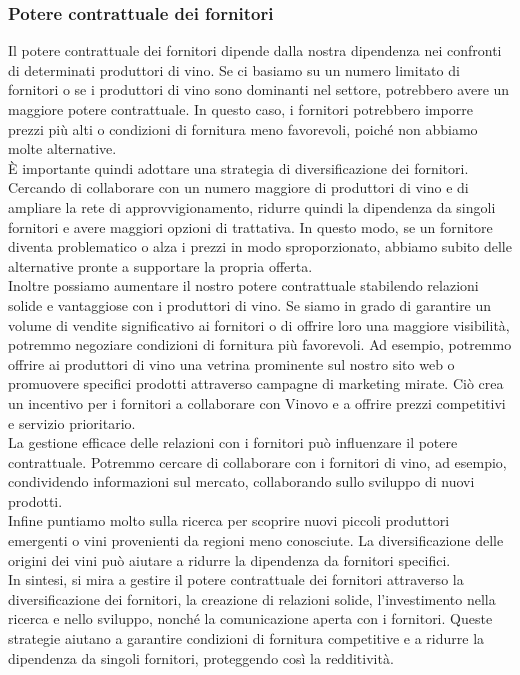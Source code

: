 \documentclass[12pt, a4paper]{article}
\newcommand{\meskip}{\medskip \\}
\newcommand{\bskip}{\bigskip \\}
\begin{document}
\subsubsection{Potere contrattuale dei fornitori}
Il potere contrattuale dei fornitori dipende dalla nostra dipendenza nei confronti di determinati produttori di vino. Se ci basiamo su un numero limitato di fornitori o se i produttori di vino sono dominanti nel settore, potrebbero avere un maggiore potere contrattuale. In questo caso, i fornitori potrebbero imporre prezzi più alti o condizioni di fornitura meno favorevoli, poiché non abbiamo molte alternative.\meskip
È importante quindi adottare una strategia di diversificazione dei fornitori. Cercando di collaborare con un numero maggiore di produttori di vino e di ampliare la rete di approvvigionamento, ridurre quindi la dipendenza da singoli fornitori e avere maggiori opzioni di trattativa. In questo modo, se un fornitore diventa problematico o alza i prezzi in modo sproporzionato, abbiamo subito delle alternative pronte a supportare la propria offerta.\meskip
Inoltre possiamo aumentare il nostro potere contrattuale stabilendo relazioni solide e vantaggiose con i produttori di vino. Se siamo in grado di garantire un volume di vendite significativo ai fornitori o di offrire loro una maggiore visibilità, potremmo negoziare condizioni di fornitura più favorevoli. Ad esempio, potremmo offrire ai produttori di vino una vetrina prominente sul nostro sito web o promuovere specifici prodotti attraverso campagne di marketing mirate. Ciò crea un incentivo per i fornitori a collaborare con Vinovo e a offrire prezzi competitivi e servizio prioritario.\meskip
La gestione efficace delle relazioni con i fornitori può influenzare il potere contrattuale. Potremmo cercare di collaborare con i fornitori di vino, ad esempio, condividendo informazioni sul mercato, collaborando sullo sviluppo di nuovi prodotti.\meskip
Infine puntiamo molto sulla ricerca per scoprire nuovi piccoli produttori emergenti o vini provenienti da regioni meno conosciute. La diversificazione delle origini dei vini può aiutare a ridurre la dipendenza da fornitori specifici.\bskip
In sintesi, si mira a gestire il potere contrattuale dei fornitori attraverso la diversificazione dei fornitori, la creazione di relazioni solide, l'investimento nella ricerca e nello sviluppo, nonché la comunicazione aperta con i fornitori. Queste strategie aiutano a garantire condizioni di fornitura competitive e a ridurre la dipendenza da singoli fornitori, proteggendo così la redditività.
\end{document}

